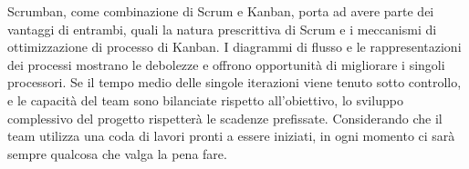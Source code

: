 Scrumban, come combinazione di Scrum e Kanban, porta ad avere parte dei vantaggi di entrambi, quali la natura prescrittiva di Scrum e i meccanismi di ottimizzazione di processo di Kanban.
I diagrammi di flusso e le rappresentazioni dei processi mostrano le debolezze e offrono opportunità di migliorare i singoli processori.
Se il tempo medio delle singole iterazioni viene tenuto sotto controllo, e le capacità del team sono bilanciate rispetto all'obiettivo, lo sviluppo complessivo del progetto rispetterà le scadenze prefissate.
Considerando che il team utilizza una coda di lavori pronti a essere iniziati, in ogni momento ci sarà sempre qualcosa che valga la pena fare.
\\
